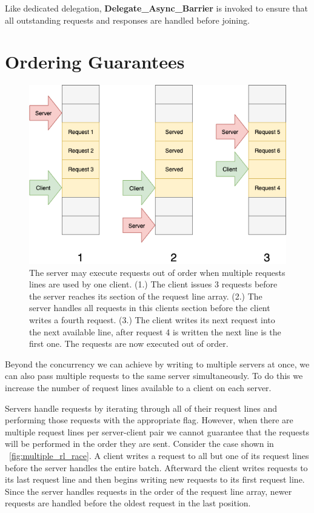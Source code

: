 \documentclass{uicthesi}
\begin{document}
Like dedicated delegation, \textbf{Delegate\_Async\_Barrier} is invoked to ensure that all outstanding requests and responses are handled before joining. 

\section{Ordering Guarantees}
\begin{figure}[ht!]
\centering
\includegraphics[width=0.9\columnwidth]{FIG/multiple_rl_race.png}
\caption{The server may execute requests out of order when multiple requests lines are used by one client. (1.) The client issues 3 requests before the server reaches its section of the request line array. (2.) The server handles all requests in this clients section before the client writes a fourth request. (3.) The client writes its next request into the next available line, after request 4 is written the next line is the first one. The requests are now executed out of order.}
\label{fig:mulitple_rl_race}
\end{figure}
Beyond the concurrency we can achieve by writing to multiple servers at once, we can also pass multiple requests to the same server simultaneously. To do this we increase the number of request lines available to a client on each server. 

Servers handle requests by iterating through all of their request lines and performing those requests with the appropriate flag. However, when there are multiple request lines per server-client pair we cannot guarantee that the requests will be performed in the order they are sent. Consider the case shown in ~\ref{fig:multiple_rl_race}.  A client writes a request to all but one of its request lines before the server handles the entire batch. Afterward the client writes requests to its last request line and then begins writing new requests to its first request line. Since the server handles requests in the order of the request line array, newer requests are handled before the oldest request in the last position. 
\end{document}
